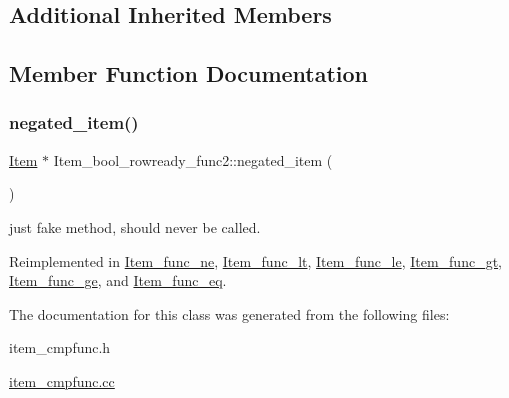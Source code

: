 \subsection*{Additional Inherited Members}


\subsection{Member Function Documentation}
\mbox{\label{classItem__bool__rowready__func2_a93c59c6f9aa848020c85975f792ba85a}} 
\subsubsection{\texorpdfstring{negated\+\_\+item()}{negated\_item()}}
{\footnotesize\ttfamily \mbox{\hyperlink{classItem}{Item}} $\ast$ Item\+\_\+bool\+\_\+rowready\+\_\+func2\+::negated\+\_\+item (\begin{DoxyParamCaption}{ }\end{DoxyParamCaption})\hspace{0.3cm}{\ttfamily [virtual]}}

just fake method, should never be called. 

Reimplemented in \mbox{\hyperlink{classItem__func__ne_a2ea1a7165722dac5d173f1cff8b920ef}{Item\+\_\+func\+\_\+ne}}, \mbox{\hyperlink{classItem__func__lt_a79050db0ccd1153a0550dc3f41753f19}{Item\+\_\+func\+\_\+lt}}, \mbox{\hyperlink{classItem__func__le_abb719e00bab4ec5c15f9567cf53c5ea5}{Item\+\_\+func\+\_\+le}}, \mbox{\hyperlink{classItem__func__gt_ab45dc92cd853e77400c6bc11626fba33}{Item\+\_\+func\+\_\+gt}}, \mbox{\hyperlink{classItem__func__ge_a83f8b765667646ef94a3771cc6f84f54}{Item\+\_\+func\+\_\+ge}}, and \mbox{\hyperlink{classItem__func__eq_a5e6489bc7481658c4f878ad99846f323}{Item\+\_\+func\+\_\+eq}}.



The documentation for this class was generated from the following files\+:\begin{DoxyCompactItemize}
\item 
item\+\_\+cmpfunc.\+h\item 
\mbox{\hyperlink{item__cmpfunc_8cc}{item\+\_\+cmpfunc.\+cc}}\end{DoxyCompactItemize}
